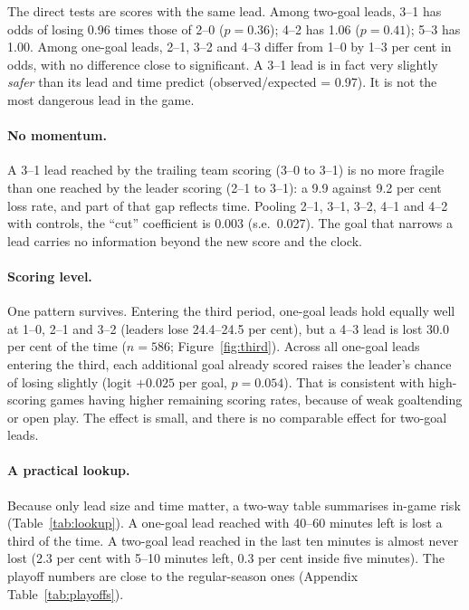 \documentclass[11pt]{article}
\begin{document}
The direct tests are scores with the same lead. Among two-goal leads, 3--1 has odds of losing 0.96 times those of 2--0 ($p=0.36$); 4--2 has 1.06 ($p=0.41$); 5--3 has 1.00. Among one-goal leads, 2--1, 3--2 and 4--3 differ from 1--0 by 1--3 per cent in odds, with no difference close to significant. A 3--1 lead is in fact very slightly \emph{safer} than its lead and time predict (observed/expected = 0.97). It is not the most dangerous lead in the game.

\paragraph{No momentum.} A 3--1 lead reached by the trailing team scoring (3--0 to 3--1) is no more fragile than one reached by the leader scoring (2--1 to 3--1): a 9.9 against 9.2 per cent loss rate, and part of that gap reflects time. Pooling 2--1, 3--1, 3--2, 4--1 and 4--2 with controls, the ``cut'' coefficient is 0.003 (s.e.\ 0.027). The goal that narrows a lead carries no information beyond the new score and the clock.

\paragraph{Scoring level.} One pattern survives. Entering the third period, one-goal leads hold equally well at 1--0, 2--1 and 3--2 (leaders lose 24.4--24.5 per cent), but a 4--3 lead is lost 30.0 per cent of the time ($n=586$; Figure~\ref{fig:third}). Across all one-goal leads entering the third, each additional goal already scored raises the leader's chance of losing slightly (logit $+0.025$ per goal, $p=0.054$). That is consistent with high-scoring games having higher remaining scoring rates, because of weak goaltending or open play. The effect is small, and there is no comparable effect for two-goal leads.

\paragraph{A practical lookup.} Because only lead size and time matter, a two-way table summarises in-game risk (Table~\ref{tab:lookup}). A one-goal lead reached with 40--60 minutes left is lost a third of the time. A two-goal lead reached in the last ten minutes is almost never lost (2.3 per cent with 5--10 minutes left, 0.3 per cent inside five minutes). The playoff numbers are close to the regular-season ones (Appendix Table~\ref{tab:playoffs}).
\end{document}
